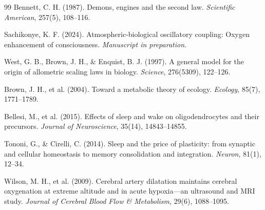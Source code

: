\documentclass[12pt,twocolumn]{article}
\theoremstyle{remark}
\begin{document}
\begin{thebibliography}{99}
Bennett, C. H. (1987). Demons, engines and the second law. \textit{Scientific American}, 257(5), 108--116.

Sachikonye, K. F. (2024). Atmospheric-biological oscillatory coupling: Oxygen enhancement of consciousness. \textit{Manuscript in preparation}.

West, G. B., Brown, J. H., \& Enquist, B. J. (1997). A general model for the origin of allometric scaling laws in biology. \textit{Science}, 276(5309), 122--126.

Brown, J. H., et al. (2004). Toward a metabolic theory of ecology. \textit{Ecology}, 85(7), 1771--1789.

Bellesi, M., et al. (2015). Effects of sleep and wake on oligodendrocytes and their precursors. \textit{Journal of Neuroscience}, 35(14), 14843--14855.

Tononi, G., \& Cirelli, C. (2014). Sleep and the price of plasticity: from synaptic and cellular homeostasis to memory consolidation and integration. \textit{Neuron}, 81(1), 12--34.

Wilson, M. H., et al. (2009). Cerebral artery dilatation maintains cerebral oxygenation at extreme altitude and in acute hypoxia—an ultrasound and MRI study. \textit{Journal of Cerebral Blood Flow \& Metabolism}, 29(6), 1088--1095.

\end{thebibliography}
\end{document}
